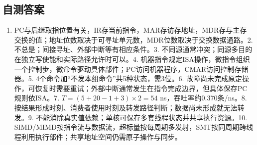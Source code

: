 \subsection{自测答案}\label{CO05-recall-answers}

\begin{enumerate}
\def\labelenumi{\arabic{enumi}.}
\tightlist
\item
  PC与后继取指位置有关，IR存当前指令，MAR存访存地址，MDR存与主存交换的值；地址位数取决于可寻址单元数，MDR位数取决于交换数据通路。2. 不总是；间接寻址、外部中断等有相应条件。3. 不同源通常冲突；同源多目的在独立写使能和实际路径允许时可以。4. 机器指令规定ISA操作，微指令组织一个控制步，微命令驱动具体部件；PC访问机器程序，CMAR访问控制存储器。5. 4个命令加``不发本组命令''共5种状态，需3位。6. 故障尚未完成原定操作，可恢复时需要重试；外部中断通常发生在指令完成边界，但具体保存PC规则依ISA。7. \(T=(5+20-1+3)\times2=54\) ns，吞吐率约0.370条/ns。8. 按结果形成时刻、消费者使用时刻及转发路径判断；数据尚未形成就无法转发。9. 不能消除真实值依赖；单核可保存多套线程状态并共享执行资源。10. SIMD/MIMD按指令流与数据流，超标量按每周期多发射，SMT按同周期跨线程利用执行部件；共享地址空间仍需原子操作与同步。
\end{enumerate}

